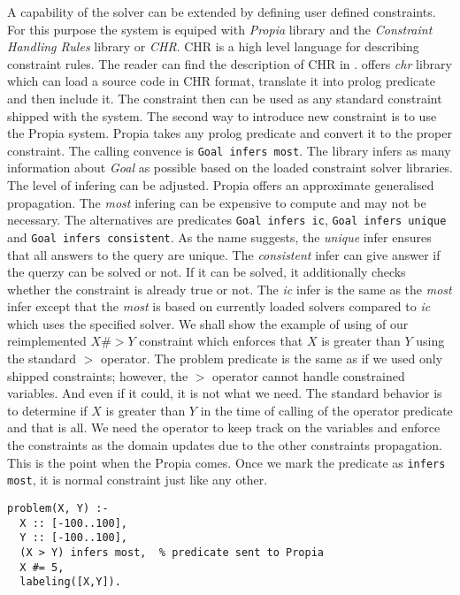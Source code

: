 A capability of the solver can be extended by defining user defined constraints. For this
purpose the system is equiped with {\em Propia} library and the {\em Constraint Handling Rules}
library or {\em CHR}. CHR is a high level language for describing constraint rules. The reader can find
the description of CHR in \cite{fru_chr_book_2009}.
\eclipse offers {\em chr} library which can load a source code in CHR format, translate it
into prolog predicate and then include it. The constraint then can be used as any standard
constraint shipped with the system.
The second way to introduce new constraint is to use the Propia system. Propia takes 
any prolog predicate and convert it to the proper constraint.
The calling convence is \texttt{Goal infers most}. The library infers as many information about {\em Goal} 
as possible based on the loaded constraint solver libraries. The level of infering can be adjusted.
Propia offers an approximate generalised propagation. The {\em most} infering can be expensive 
to compute and may not be necessary. The alternatives are predicates \texttt{Goal infers ic}, 
\texttt{Goal infers unique} and \texttt{Goal infers consistent}. As the name suggests, the {\em unique} 
infer ensures that all answers to the query are unique. The {\em consistent} infer can give
answer if the querzy can be solved or not. If it can be solved, it additionally checks whether the
constraint is already true or not. The {\em ic} infer is the same as the {\em most} infer except that
the {\em most} is based on currently loaded solvers compared to {\em ic} which uses the specified solver.
We shall show the example of using of our reimplemented $X \#> Y$ constraint which 
enforces that $X$ is greater than $Y$ using the standard $>$ operator. The problem predicate is the same 
as if we used only shipped constraints; however, the $>$ operator cannot handle constrained
variables. And even if it could, it is not what we need. The standard behavior is to 
determine if $X$ is greater than $Y$ in the time of calling of the operator predicate and
that is all. We need the operator to keep track on the variables and enforce the constraints
as the domain updates due to the other constraints propagation. This is the point when the Propia
comes. Once we mark the predicate as \texttt{infers most}, it is normal
constraint just like any other.

\begin{verbatim}
problem(X, Y) :-
  X :: [-100..100], 
  Y :: [-100..100], 
  (X > Y) infers most,  % predicate sent to Propia   
  X #= 5, 
  labeling([X,Y]).
\end{verbatim}

